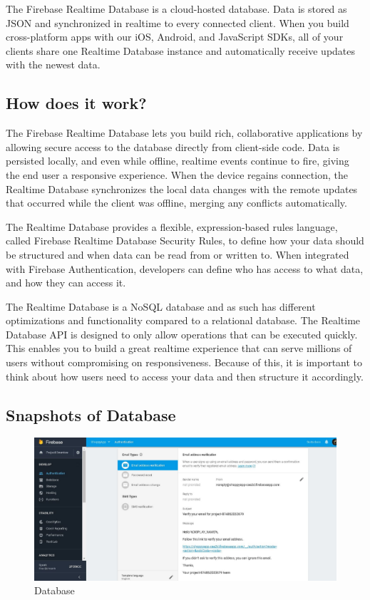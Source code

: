The Firebase Realtime Database is a cloud-hosted database. Data is stored as JSON and synchronized in realtime to every connected client. When you build cross-platform apps with our iOS, Android, and JavaScript SDKs, all of your clients share one Realtime Database instance and automatically receive updates with the newest data.
\subsection{How does it work?}
The Firebase Realtime Database lets you build rich, collaborative applications by allowing secure access to the database directly from client-side code. Data is persisted locally, and even while offline, realtime events continue to fire, giving the end user a responsive experience. When the device regains connection, the Realtime Database synchronizes the local data changes with the remote updates that occurred while the client was offline, merging any conflicts automatically.

The Realtime Database provides a flexible, expression-based rules language, called Firebase Realtime Database Security Rules, to define how your data should be structured and when data can be read from or written to. When integrated with Firebase Authentication, developers can define who has access to what data, and how they can access it.

The Realtime Database is a NoSQL database and as such has different optimizations and functionality compared to a relational database. The Realtime Database API is designed to only allow operations that can be executed quickly. This enables you to build a great realtime experience that can serve millions of users without compromising on responsiveness. Because of this, it is important to think about how users need to access your data and then structure it accordingly.



\subsection{Snapshots of Database}

\newpage

\begin{figure}[ht]
\centering
\includegraphics[scale=0.50]{images/firbase14.png}
\caption{Database}
\end{figure}

